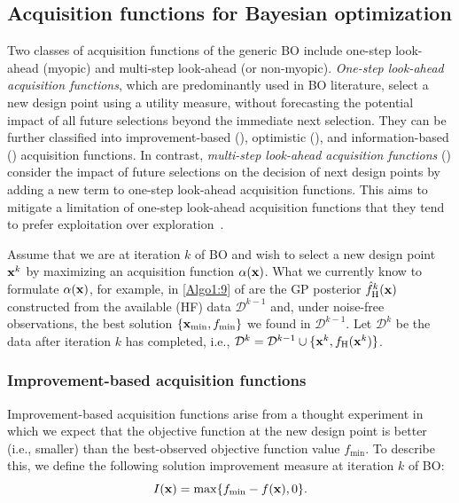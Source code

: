 \documentclass[journal ]{new-aiaa}
\begin{document}
	\subsection{Acquisition functions for Bayesian optimization}\label{Sec51}
	
	Two classes of acquisition functions of the generic BO include one-step look-ahead (myopic) and multi-step look-ahead (or non-myopic).
	\textit{One-step look-ahead acquisition functions}, which are predominantly used in BO literature, select a new design point using a utility measure, without forecasting the potential impact of all future selections beyond the immediate next selection.
	They can be further classified into improvement-based (), optimistic (), and  information-based () acquisition functions.
	In contrast, \textit{multi-step look-ahead acquisition functions} () consider the impact of future selections on the decision of next design points by adding a new term to one-step look-ahead acquisition functions.
	This aims to mitigate a limitation of one-step look-ahead acquisition functions that they tend to prefer exploitation over exploration~\citep{Hennig2022}.
	
	Assume that we are at iteration $k$ of BO and wish to select a new design point ${\bf x}^{k}$ by maximizing an acquisition function $\alpha({\bf x})$.
	What we currently know to formulate $\alpha({\bf x})$, for example, in \cref{Algo1:9} of  are the GP posterior $\hat{f}_\text{H}^k({\bf x})$ constructed from the available (HF) data $\mathcal{D}^{k-1}$ and, under noise-free observations, the best solution $\{{\bf x}_{\min}, f_{\min}\}$ we found in $\mathcal{D}^{k-1}$.
	Let $\mathcal{D}^{k}$ be the data after iteration $k$ has completed, i.e., $\mathcal{D}^{k} = \mathcal{D}^{k-1} \cup \{{\bf x}^{k},f_\text{H}({\bf x}^{k})\}$.
	
	\subsubsection{Improvement-based acquisition functions}\label{Sec511}
	
	Improvement-based acquisition functions arise from a thought experiment in which we expect that the objective function at the new design point is better (i.e., smaller) than the best-observed objective function value $f_\text{min}$.
	To describe this, we define the following solution improvement measure at iteration $k$ of BO:
	\begin{equation}\label{eqn37}
		I({\bf x}) = \max\{f_\text{min}-f({\bf x}),0\}.
	\end{equation}
	
\end{document}
